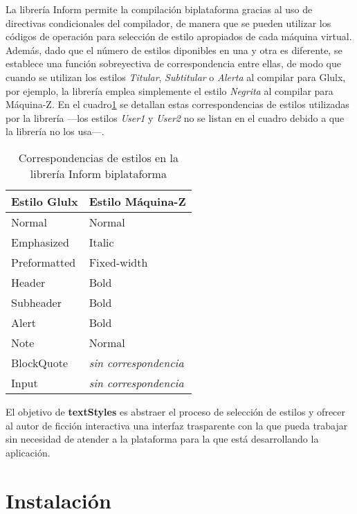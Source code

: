 \documentclass[a4paper,12pt]{article}
\numberwithin{equation}{section}
\begin{document}
La librería Inform permite la compilación biplataforma gracias al uso de directivas condicionales del compilador, de manera que se pueden utilizar los códigos de operación para selección de estilo apropiados de cada máquina virtual. Además, dado que el número de estilos diponibles en una y otra es diferente, se establece una función sobreyectiva de correspondencia entre ellas, de modo que cuando se utilizan los estilos \emph{Titular}, \emph{Subtitular} o \emph{Alerta} al compilar para Glulx, por ejemplo, la librería emplea simplemente el estilo \emph{Negrita} al compilar para Máquina-Z. En el cuadro\ref{table:correspondencias-estilos-glulx-z} se detallan estas correspondencias de estilos utilizadas por la librería ---los estilos \emph{User1} y \emph{User2} no se listan en el cuadro debido a que la librería no los usa---.

\begin{table}[]
\centering
\begin{tabular}{ll}
\hline
\textbf{Estilo Glulx}	& \textbf{Estilo Máquina-Z}		\\ \hline
Normal					& Normal						\\
Emphasized				& Italic						\\
Preformatted			& Fixed-width					\\
Header					& Bold							\\
Subheader				& Bold							\\
Alert					& Bold							\\
Note					& Normal						\\
BlockQuote				& \emph{sin correspondencia}	\\
Input					& \emph{sin correspondencia}	\\ \hline
\end{tabular}
\caption{Correspondencias de estilos en la librería Inform biplataforma}
\label{table:correspondencias-estilos-glulx-z}
\end{table}

El objetivo de \textbf{textStyles} es abstraer el proceso de selección de estilos y ofrecer al autor de ficción interactiva una interfaz trasparente con la que pueda trabajar sin necesidad de atender a la plataforma para la que está desarrollando la aplicación.


\section{Instalación} \label{sec:instalacion}
\end{document}

